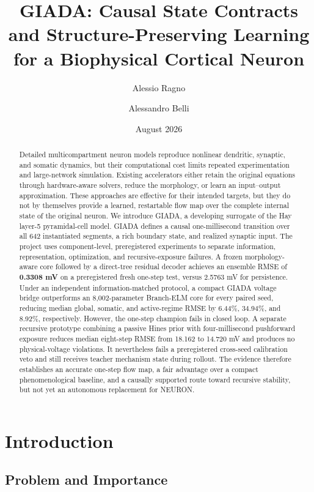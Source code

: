 \documentclass[11pt]{article}
\title{GIADA: Causal State Contracts and Structure-Preserving Learning\\
for a Biophysical Cortical Neuron}
\author{Alessio Ragno \and Alessandro Belli}
\date{August 2026}
\begin{document}
\maketitle

\begin{abstract}
Detailed multicompartment neuron models reproduce nonlinear dendritic,
synaptic, and somatic dynamics, but their computational cost limits repeated
experimentation and large-network simulation. Existing accelerators either
retain the original equations through hardware-aware solvers, reduce the
morphology, or learn an input--output approximation. These approaches are
effective for their intended targets, but they do not by themselves provide a
learned, restartable flow map over the complete internal state of the original
neuron. We introduce GIADA, a developing surrogate of the Hay layer-5
pyramidal-cell model. GIADA defines a causal one-millisecond transition over
all 642 instantiated segments, a rich boundary state, and realized synaptic
input. The project uses component-level, preregistered experiments to separate
information, representation, optimization, and recursive-exposure failures.
A frozen morphology-aware core followed by a direct-tree residual decoder
achieves an ensemble RMSE of \textbf{0.3308 mV} on a preregistered fresh
one-step test, versus 2.5763 mV for persistence. Under an independent
information-matched protocol, a compact GIADA voltage bridge outperforms an
8,002-parameter Branch-ELM core for every paired seed, reducing median global,
somatic, and active-regime RMSE by 6.44\%, 34.94\%, and 8.92\%, respectively.
However, the one-step champion fails in closed loop. A separate recursive
prototype combining a passive Hines prior with four-millisecond pushforward
exposure reduces median eight-step RMSE from 18.162 to 14.720 mV and produces
no physical-voltage violations. It nevertheless fails a preregistered
cross-seed calibration veto and still receives teacher mechanism state during
rollout. The evidence therefore establishes an accurate one-step flow map, a
fair advantage over a compact phenomenological baseline, and a causally
supported route toward recursive stability, but not yet an autonomous
replacement for NEURON.
\end{abstract}

\section{Introduction}

\subsection{Problem and Importance}
\end{document}

